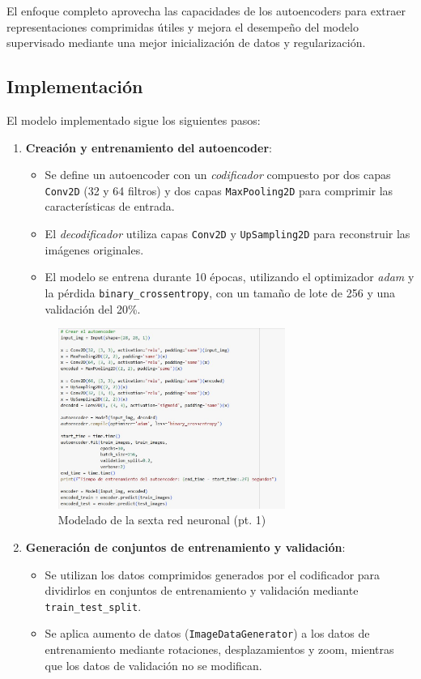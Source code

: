 El enfoque completo aprovecha las capacidades de los autoencoders para extraer representaciones comprimidas útiles y mejora el desempeño del modelo supervisado mediante una mejor inicialización de datos y regularización.


\subsection{Implementación}

El modelo implementado sigue los siguientes pasos:

\begin{enumerate}
	\item \textbf{Creación y entrenamiento del autoencoder}:
	\begin{itemize}
		\item Se define un autoencoder con un \textit{codificador} compuesto por dos capas \texttt{Conv2D} (32 y 64 filtros) y dos capas \texttt{MaxPooling2D} para comprimir las características de entrada.
		\item El \textit{decodificador} utiliza capas \texttt{Conv2D} y \texttt{UpSampling2D} para reconstruir las imágenes originales.
		\item El modelo se entrena durante 10 épocas, utilizando el optimizador \textit{adam} y la pérdida \texttt{binary\_crossentropy}, con un tamaño de lote de 256 y una validación del 20\%.
	\end{itemize}
	
	\begin{figure}[H]
		\centering
		\includegraphics[width=0.7\textwidth]{imgs/model-1-red6.JPG}
		\caption{Modelado de la sexta red neuronal (pt. 1)}
		\label{fig:model-1-red6}
	\end{figure}
	
	\item \textbf{Generación de conjuntos de entrenamiento y validación}:
	\begin{itemize}
		\item Se utilizan los datos comprimidos generados por el codificador para dividirlos en conjuntos de entrenamiento y validación mediante \texttt{train\_test\_split}.
		\item Se aplica aumento de datos (\texttt{ImageDataGenerator}) a los datos de entrenamiento mediante rotaciones, desplazamientos y zoom, mientras que los datos de validación no se modifican.
	\end{itemize}
	

\end{enumerate}
